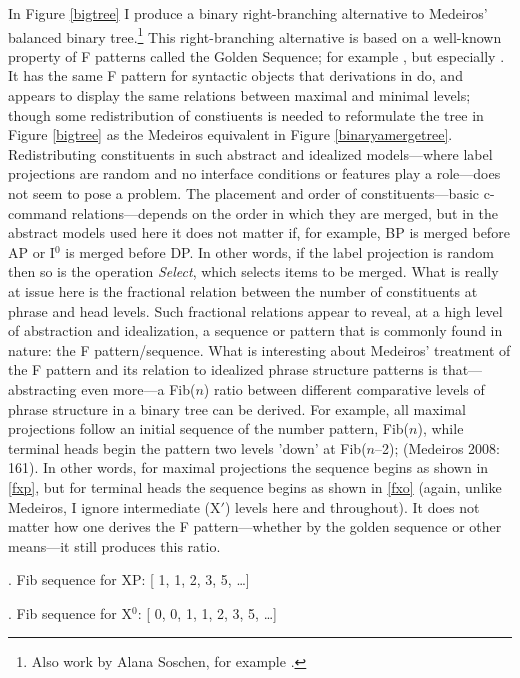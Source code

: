 \documentclass[11pt,twoside]{article}
\theoremstyle{plain}
\numberwithin{equation}{section}
\theoremstyle{definition}
\newtheorem{phrase string}{Phrase String}
\begin{document}
In Figure \ref{bigtree} I produce a binary right-branching alternative to Medeiros' balanced binary tree.\footnote{Also work by Alana Soschen, for example \cite{soschen:2008}.} This right-branching alternative is based on a well-known property of F patterns called the Golden Sequence; for example \cite{livio:2002}, but especially \cite{uriagereka:1998}. It has the same F pattern for syntactic objects that derivations in \cite{medeiros:2008} do, and appears to display the same relations between maximal and minimal levels; though some redistribution of constiuents is needed to reformulate the tree in Figure \ref{bigtree} as the Medeiros equivalent in Figure \ref{binaryamergetree}. Redistributing constituents in such abstract and idealized models---where label projections are random and no interface conditions or features play a role---does not seem to pose a problem. The placement and order of constituents---basic c-command relations---depends on the order in which they are merged, but in the abstract models used here it does not matter if, for example, BP is merged before AP or I$^{0}$ is merged before DP. In other words, if the label projection is random then so is the operation \textsl{Select}, which selects items to be merged. What is really at issue here is the fractional relation between the number of constituents at phrase and head levels. Such fractional relations appear to reveal, at a high level of abstraction and idealization, a sequence or pattern that is commonly found in nature: the F pattern/sequence. 
What is interesting about Medeiros' treatment of the F pattern and its relation to idealized phrase structure patterns is that---abstracting even more---a Fib($n$) ratio between different comparative levels of phrase structure in a binary tree can be derived. For example, all maximal projections follow an initial sequence of the number pattern, Fib($n$), while terminal heads begin the pattern two levels 'down' at Fib($n$--2); (Medeiros 2008: 161). In other words, for maximal projections the sequence begins as shown in \ref{fxp}, but for terminal heads the sequence begins as shown in \ref{fxo} (again, unlike Medeiros, I ignore intermediate (X$'$) levels here and throughout). It does not matter how one derives the F pattern---whether by the golden sequence or other means---it still produces this ratio.  

\ex. Fib sequence for XP: [ 1, 1, 2, 3, 5, \ldots ]\label{fxp}

\ex. Fib sequence for X$^{0}$: [ 0, 0, 1, 1, 2, 3, 5, \ldots ]\label{fxo}	
\end{document}
